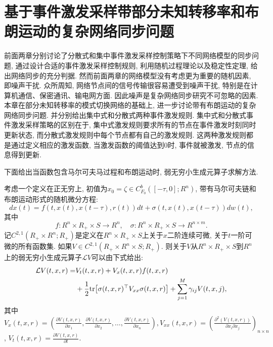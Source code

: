 

\chapter{基于事件激发采样带部分未知转移率和布朗运动的复杂网络同步问题}

        前面两章分别讨论了分散式和集中事件激发采样控制策略下不同网络模型的同步问题, 通过设计合适的事件激发采样控制规则, 利用随机过程理论以及稳定性定理, 给出网络同步的充分判据. 然而前面两章的网络模型没有考虑更为重要的随机因素, 即噪声干扰. 众所周知, 网络节点间的信号传输很容易遭受到噪声干扰, 特别是在计算机通信、保密通讯、输电网方面. 因此噪声是复杂网络同步研究不可忽略的因素. 本章在部分未知转移率的模式切换网络的基础上, 进一步讨论带有布朗运动的复杂网络同步问题. 并分别给出集中式和分散式两种事件激发规则. 集中式和分散式事件激发采样策略的区别在于, 集中式激发规则要求所有的节点在事件激发时刻同时更新状态, 而分散式激发规则中每个节点都有自己的激发规则. 这两种激发规则都是通过定义相应的激发函数, 当激发函数的阈值达到$0$时, 事件就被激发, 节点的信息得到更新.

        下面给出当函数包含马尔可夫马过程和布朗运动时, 弱无穷小生成元算子求解方法.
        \begin{lem}\label{ET}{\rm{}}
        考虑一个定义在正无穷上, 初值为$x_0=\zeta \in C_{F_0}^b([-\tau,0];R^n)$, 带有马尔可夫链和布朗运动形式的随机微分方程:
        $$dx(t)\!=\!f(t,x(t),x(t-\tau),r(t))dt+\sigma(t,x(t),x(t-\tau))dw(t),$$
        其中
        $$ f:R^n\times R_{+}\times S \rightarrow R^n,  \quad  \sigma:R^n\times R_{+}\times S \rightarrow R^{n\times m}.$$
        记$C^{2,1}(R_{+}\times R^n;R_{+})$是定义在$R^n\times R_{+}\times S$上关于$x$二阶连续可微, 关于$t$一阶可微的所有函数集. 如果$V\in C^{2,1}(R_{+}\times R^n \times S;R_{+})$.
        则关于$V$从$R^n\times R_{+}\times S $到$R^n$上的弱无穷小生成元算子$\mathcal{L}V$可以由下式给出:
        \begin{align}
        \mathcal{L} V(t,x,r)=&V_t{(t,x,r)}+V_{x}{(t,x,r)}f(t,x,r) \notag \\
                 &+\frac{1}{2}\mathrm{tr}\big [\sigma(t,x,r)^\top V_{xx}\sigma(t,x,r)\big ]+\sum_{j=1}^M\gamma_{ij}V(t,x,j),
        \end{align}
        其中$V_{x}{(t,x,r)}=(\frac{\partial V(t,x,r) }{\partial x_1},
        \frac{\partial V(t,x,r) }{\partial x_2},\ldots,\frac{\partial V(t,x,r) }{\partial x_n}),V_{xx}{(t,x,r)}=(\frac{\partial^2(V(t,x,r)) }{\partial x_i \partial x_j})_{n\times n}$, $V_t{(t,x,r)}=\frac{\partial V(t,x,r) }{\partial t}.$
         \end{lem}

